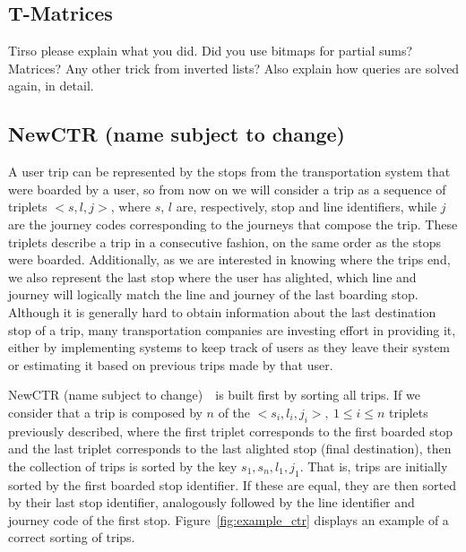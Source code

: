 \documentclass[runningheads]{llncs}
\newcommand{\acumm}{T-Matrices} %
\newcommand{\ctr}{NewCTR (name subject to change)\ }
\begin{document}
\subsection{\acumm}
Tirso please explain what you did. Did you use bitmaps for partial sums? Matrices? Any other trick from inverted lists? Also explain how queries are solved again, in detail.

\subsection{\ctr}
A user trip can be represented by the stops from the transportation system that were boarded by a user, so from now on we will consider a trip as a sequence of triplets $<s,l,j>$, where $s$, $l$ are, respectively, stop and line identifiers, while $j$ are the journey codes corresponding to the journeys that compose the trip. These triplets describe a trip in a consecutive fashion, on the same order as the stops were boarded. Additionally, as we are interested in knowing where the trips end, we also represent the last stop where the user has alighted, which line and journey will logically match the line and journey of the last boarding stop. Although it is generally hard to obtain information about the last destination stop of a trip, many transportation companies are investing effort in providing it, either by implementing systems to keep track of users as they leave their system or estimating it based on previous trips made by that user.

\ctr~is built first by sorting all trips. If we consider that a trip is composed by $n$ of the $<s_i,l_i,j_i>,~1\leq i\leq n$ triplets previously described, where the first triplet corresponds to the first boarded stop and the last triplet corresponds to the last alighted stop (final destination), then the collection of trips is sorted by the key $s_1,s_n,l_1,j_1$. That is, trips are initially sorted by the first boarded stop identifier. If these are equal, they are then sorted by their last stop identifier, analogously followed by the line identifier and journey code of the first stop. Figure~\ref{fig:example_ctr} displays an example of a correct sorting of trips.
\end{document}
